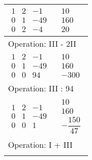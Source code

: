 \begin{longtable}{p{4cm}|p{3cm}}
  $\displaystyle\begin{matrix}
                    1 & 2 & -1 \\ 0 & 1 & -49 \\ 0 & 2 & -4
                  \end{matrix}$         &
  $\displaystyle\begin{matrix}
                    10 \\ 160 \\ 20
                  \end{matrix}$                                                              \\\hline

  \multicolumn{2}{p{\dimexpr4cm+3cm+2\tabcolsep\relax}}{Operation: III - 2II}               \\\hline\pagebreak[0]

  $\displaystyle\begin{matrix}
                    1 & 2 & -1 \\ 0 & 1 & -49 \\ 0 & 0 & 94
                  \end{matrix}$         &
  $\displaystyle\begin{matrix}
                    10 \\ 160 \\ -300
                  \end{matrix}$                                                            \\\hline

  \multicolumn{2}{p{\dimexpr4cm+3cm+2\tabcolsep\relax}}{Operation: III : 94}                \\\hline\pagebreak[0]

  $\displaystyle\begin{matrix}
                    1 & 2 & -1 \\ 0 & 1 & -49 \\ 0 & 0 & 1
                  \end{matrix}$          &
  $\displaystyle\begin{matrix}
                    10 \\ 160 \\ -\dfrac{150}{47}
                  \end{matrix}$                                                \\\hline

  \multicolumn{2}{p{\dimexpr4cm+3cm+2\tabcolsep\relax}}{Operation: I + III}                 \\\hline\pagebreak[0]


\end{longtable}
